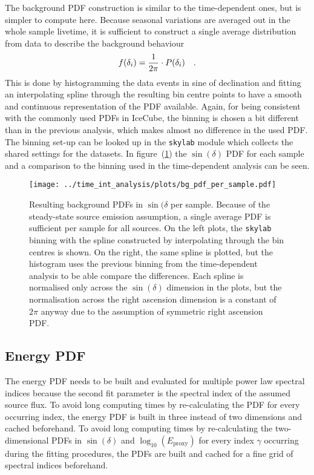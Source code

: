 The background PDF construction is similar to the time-dependent ones, but is simpler to compute here.
Because seasonal variations are averaged out in the whole sample livetime, it is sufficient to construct a single average distribution from data to describe the background behaviour
\begin{equation}
  f(\delta_i) = \frac{1}{2\pi}\cdot P(\delta_i)
  \quad\text{.}
\end{equation}
This is done by histogramming the data events in sine of declination and fitting an interpolating spline through the resulting bin centre points to have a smooth and continuous representation of the PDF available.
Again, for being consistent with the commonly used PDFs in IceCube, the binning is chosen a bit different than in the previous analysis, which makes almost no difference in the used PDF.
The binning set-up can be looked up in the \lstinline!skylab! module which collects the shared settings for the datasets.
In figure~(\ref{fig:tindep_bg_pdf_per_sample}) the $\sin(\delta)$ PDF for each sample and a comparison to the binning used in the time-dependent analysis can be seen.

\begin{figure}[htbp]
  \centering
  \texttt{[image: ../time\_int\_analysis/plots/bg\_pdf\_per\_sample.pdf]}
  \caption[Background PDFs per source per sample for the time-integrated analysis]{
    Resulting background PDFs in $\sin(\delta$ per sample.
    Because of the steady-state source emission assumption, a single average PDF is sufficient per sample for all sources.
    On the left plots, the \lstinline!skylab! binning with the spline constructed by interpolating through the bin centres is shown.
    On the right, the same spline is plotted, but the histogram uses the previous binning from the time-dependent analysis to be able compare the differences.
    Each spline is normalised only across the $\sin(\delta)$ dimension in the plots, but the normalisation across the right ascension dimension is a constant of $2\pi$ anyway due to the assumption of symmetric right ascension PDF.
  }
  \label{fig:tindep_bg_pdf_per_sample}
\end{figure}

\subsection*{Energy PDF}
The energy PDF needs to be built and evaluated for multiple power law spectral indices because the second fit parameter is the spectral index of the assumed source flux.
To avoid long computing times by re-calculating the PDF for every occurring index, the energy PDF is built in three instead of two dimensions and cached beforehand.
To avoid long computing times by re-calculating the two-dimensional PDFs in $\sin(\delta)$ and $\log_{10}\left(E_\text{proxy}\right)$ for every index $\gamma$ occurring during the fitting procedures, the PDFs are built and cached for a fine grid of spectral indices beforehand.

